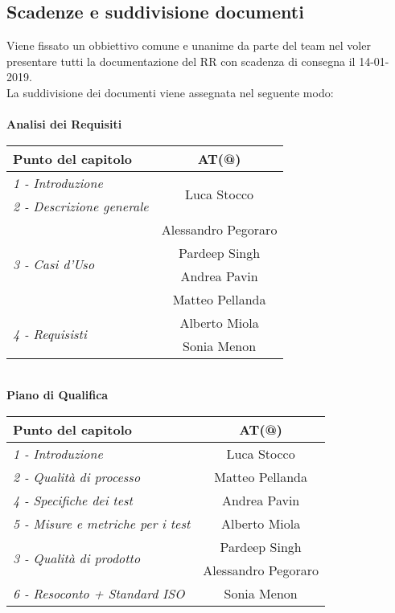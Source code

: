 \subsection{Scadenze e suddivisione documenti}
	Viene fissato un obbiettivo comune e unanime da parte del team nel voler presentare tutti la documentazione del RR con scadenza di consegna il 14-01-2019.\\
	La suddivisione dei documenti viene assegnata nel seguente modo:\\\\
	\textbf{Analisi dei Requisiti}\\[0.25cm]
		\renewcommand{\arraystretch}{1.5}
		\begin{tabular}{  l | c }
			\hline
			\textbf{Punto del capitolo}&\textbf{AT(@)}\\
			\hline
			\emph{1 - Introduzione} & \multirow{2}{*}{Luca Stocco}\\ \emph{2 - Descrizione generale}  \\
			\hline
			\multirow{4}{*}{\emph{3 - Casi d'Uso}} & Alessandro Pegoraro\\&Pardeep Singh\\&Andrea Pavin\\&Matteo Pellanda\\
			\hline
			\multirow{2}{*}{\emph{4 - Requisisti}} &  Alberto Miola\\&Sonia Menon\\
			\hline
		\end{tabular}
	\\[0.7cm]
	\textbf{Piano di Qualifica}\\[0.25cm]
	\begin{tabular}{  l | c }
		\hline
		\textbf{Punto del capitolo}&\textbf{AT(@)}\\
		\hline
		\emph{1 - Introduzione} & Luca Stocco  \\ \emph{2 - Qualità di processo} & Matteo Pellanda\\
		\hline
		\emph{4 - Specifiche dei test} & Andrea Pavin  \\ \emph{5 - Misure e metriche per i test} & Alberto Miola\\
		\hline
		\multirow{2}{*}{\emph{3 - Qualità di prodotto}} & Pardeep Singh\\&Alessandro Pegoraro\\
		\hline
	   	\emph{6 - Resoconto + Standard ISO} & Sonia Menon\\
		\hline
	\end{tabular}
	\\[1cm]
